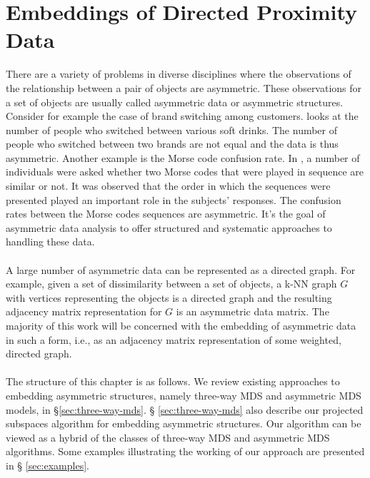 \chapter{Embeddings of Directed Proximity Data}
There are a variety of problems in diverse disciplines where the
observations of the relationship between a pair of objects are
asymmetric. These observations for a set of objects are usually called
asymmetric data or asymmetric structures. Consider for example the
case of brand switching among customers. \citet{desarbo84} looks at
the number of people who switched between various soft drinks. The
number of people who switched between two brands are not equal and the
data is thus asymmetric. Another example is the Morse code confusion
rate. In \citet{rothkopf57}, a number of individuals were asked
whether two Morse codes that were played in sequence are similar or
not. It was observed that the order in which the sequences were
presented played an important role in the subjects' responses. The
confusion rates between the Morse codes sequences are asymmetric.
It's the goal of asymmetric data analysis to
offer structured and systematic approaches to handling these data. \\
\\
%
\noindent A large number of asymmetric data can be represented as a directed
graph. For example, given a set of dissimilarity between a set of
objects, a k-NN graph $G$ with vertices representing the objects is a
directed graph and the resulting adjacency matrix representation for
$G$ is an asymmetric data matrix. The majority of this work will be
concerned with the embedding of asymmetric data in such a form, i.e.,
as an adjacency matrix representation of some weighted, directed
graph. \\ \\
%
\noindent The structure of this chapter is as follows. We review existing
approaches to embedding asymmetric structures, namely three-way MDS
and asymmetric MDS models, in \S \ref{sec:three-way-mds}. \S
\ref{sec:three-way-mds} also describe our projected subspaces algorithm
for embedding asymmetric structures. Our algorithm can be viewed as a
hybrid of the classes of three-way MDS and asymmetric MDS
algorithms. 
Some examples illustrating the working of our approach are presented in \S
\ref{sec:examples}.
%
